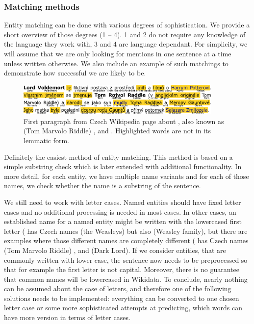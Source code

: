 \subsubsection{Matching methods}
Entity matching can be done with various degrees of sophistication. We provide a short overview of those degrees (1 -- 4). 1 and 2 do not require any knowledge of the language they work with, 3 and 4 are language dependant. For simplicity, we will assume that we are only looking for mentions in one sentence at a time unless written otherwise. We also include an example of such matchings to demonstrate how successful we are likely to be.

\begin{figure}
\centering
\includegraphics[width = 0.9\textwidth]{./img/Voldemort_infinitivy_preklad}

\caption{First paragraph from Czech Wikipedia page about , also known as  (Tom Marvolo Riddle) , and . Highlighted words are not in its lemmatic form. }


\end{figure}


 Definitely the easiest method of entity matching. This method is based on a simple substring check which is later extended with additional functionality. In more detail, for each entity, we have multiple name variants and for each of those names, we check whether the name is a substring of the sentence.



We still need to work with letter cases. Named entities should have fixed letter cases and no additional processing is needed in most cases. In other cases, an established name for a named entity might be written with the lowercased first letter ( has Czech names  (the Weasleys) but also  (Weasley family), but there are examples where those different names are completely different ( has Czech names  (Tom Marvolo Riddle) , and  (Dark Lord). If we consider entities, that are commonly written with lower case, the sentence now needs to be preprocessed so that for example the first letter is not capital. Moreover, there is no guarantee that common names will be lowercased in Wikidata. To conclude, nearly nothing can be assumed about the case of letters, and therefore one of the following solutions needs to be implemented: everything can be converted to one chosen letter case or some more sophisticated attempts at predicting, which words can have more version in terms of letter cases.

